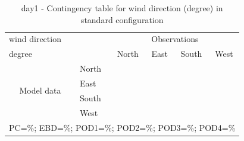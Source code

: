\begin{table}[p!]
\begin{center}
\begin{tabular}{llcccc}
\hline
{wind direction}                                       &                             &    \multicolumn{4}{c}{Observations}                 \\
{degree}                                       &                             & {North}   & {East} & {South} & {West} \\
\hline
\multicolumn{1}{c}{\multirow{4}{*}{Model data}}  & {North}                    &    &     &      & \\
                                                 & {East}                     &    &     &      & \\
                                                 & {South}                    &    &    &     & \\
                                                 & {West}                     &   &    &     & \\
\hline 
\multicolumn{6}{l}{ PC=\%; EBD=\%; POD1=\%; POD2=\%; POD3=\%; POD4=\%}                 \\
\end{tabular}
\end{center}
\caption{day1 - Contingency table for {wind direction} (degree) in standard configuration}
\label{tab:contingencywdBEF:day1}
\end{table}
